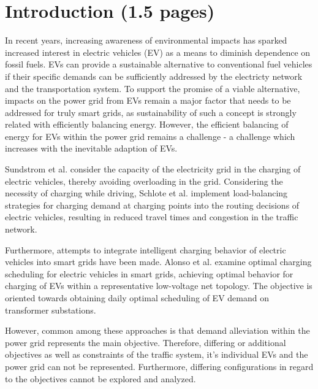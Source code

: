\section{Introduction (1.5 pages)}

In recent years, increasing awareness of environmental impacts has sparked increased interest in electric vehicles (EV) as a means to diminish dependence on fossil fuels. EVs can provide a sustainable alternative to conventional fuel vehicles if their specific demands can be sufficiently addressed by the electricty network and the transportation system.
To support the promise of a viable alternative, impacts on the power grid from EVs remain a major factor that needs to be addressed for truly smart grids, as sustainability of such a concept is strongly related with efficiently balancing energy. 
However, the efficient balancing of energy for EVs within the power grid remains a challenge - a challenge which increases with the inevitable adaption of EVs.


Sundstrom et al. \cite{sundstrom2010planning} consider the capacity of the electricity grid in the charging of electric vehicles, thereby avoiding overloading in the grid.
Considering the necessity of charging while driving, Schlote et al. \cite{schlote2012balanced} implement load-balancing strategies for charging demand at charging points into the routing decisions of electric vehicles, resulting in reduced travel times and congestion in the traffic network. 

Furthermore, attempts to integrate intelligent charging behavior of electric vehicles into smart grids have been made. 
Alonso et al. \cite{alonso2014optimal} examine optimal charging scheduling for electric vehicles in smart grids, achieving optimal behavior for charging of EVs within a representative low-voltage net topology. The objective is oriented towards obtaining daily optimal scheduling of EV demand on transformer substations.

However, common among these approaches is that demand alleviation within the power grid represents the main objective. Therefore, differing or additional objectives as well as constraints of the traffic system, it's individual EVs and the power grid can not be represented. Furthermore, differing configurations in regard to the objectives cannot be explored and analyzed. 

